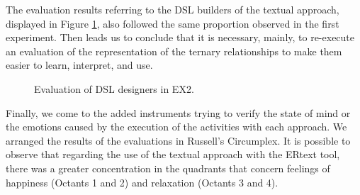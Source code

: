 The evaluation results referring to the DSL builders of the textual approach, displayed in Figure \ref{fig:inst4GERALExp2}, also followed the same proportion observed in the first experiment.
Then leads us to conclude that it is necessary, mainly, to re-execute an evaluation of the representation of the ternary relationships to make them easier to learn, interpret, and use.

\begin{figure}[!htb]
    \centering
    \caption{Evaluation of DSL designers in EX2.}
    \label{fig:inst4GERALExp2}
    
\end{figure}

Finally, we come to the added instruments trying to verify the state of mind or the emotions caused by the execution of the activities with each approach.
We arranged the results of the evaluations in Russell's Circumplex. 
It is possible to observe that regarding the use of the textual approach with the ERtext tool, there was a greater concentration in the quadrants that concern feelings of happiness (Octants 1 and 2) and relaxation (Octants 3 and 4).

